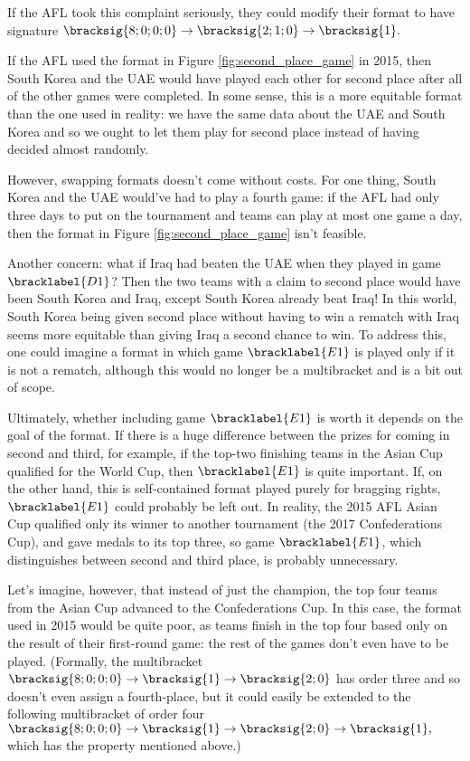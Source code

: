 {    If the AFL took this complaint seriously, they could modify their format to have signature $\bracksig{8;0;0;0} \to \bracksig{2; 1; 0} \to \bracksig{1}.$
    

    If the AFL used the format in Figure \ref{fig:second_place_game} in 2015, then South Korea and the UAE would have played each other for second place after all of the other games were completed. In some sense, this is a more equitable format than the one used in reality: we have the same data about the UAE and South Korea and so we ought to let them play for second place instead of having decided almost randomly.

    However, swapping formats doesn't come without costs. For one thing, South Korea and the UAE would've had to play a fourth game: if the AFL had only three days to put on the tournament and teams can play at most one game a day, then the format in Figure \ref{fig:second_place_game} isn't feasible.

    Another concern: what if Iraq had beaten the UAE when they played in game $\bracklabel{D1}$? Then the two teams with a claim to second place would have been South Korea and Iraq, except South Korea already beat Iraq! In this world, South Korea being given second place without having to win a rematch with Iraq seems more equitable than giving Iraq a second chance to win. To address this, one could imagine a format in which game $\bracklabel{E1}$ is played only if it is not a rematch, although this would no longer be a multibracket and is a bit out of scope.

    Ultimately, whether including game $\bracklabel{E1}$ is worth it depends on the goal of the format. If there is a huge difference between the prizes for coming in second and third, for example, if the top-two finishing teams in the Asian Cup qualified for the World Cup, then $\bracklabel{E1}$ is quite important. If, on the other hand, this is self-contained format played purely for bragging rights, $\bracklabel{E1}$ could probably be left out. In reality, the 2015 AFL Asian Cup qualified only its winner to another tournament (the 2017 Confederations Cup), and gave medals to its top three, so game $\bracklabel{E1}$, which distinguishes between second and third place, is probably unnecessary.

    Let's imagine, however, that instead of just the champion, the top four teams from the Asian Cup advanced to the Confederations Cup. In this case, the format used in 2015 would be quite poor, as teams finish in the top four based only on the result of their first-round game: the rest of the games don't even have to be played. (Formally, the multibracket $\bracksig{8;0;0;0} \to \bracksig{1} \to \bracksig{2; 0}$ has order three and so doesn't even assign a fourth-place, but it could easily be extended to the following multibracket of order four $\bracksig{8;0;0;0} \to \bracksig{1} \to \bracksig{2; 0} \to \bracksig{1},$ which has the property mentioned above.)
    
}
